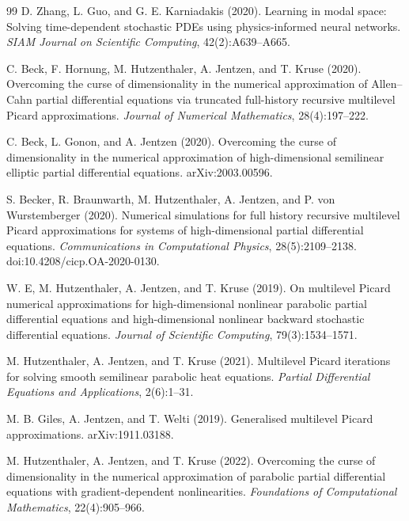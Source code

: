 \documentclass[11pt]{article}
\theoremstyle{definition}
\theoremstyle{plain}
\begin{document}
\begin{appendices}
\begin{thebibliography}{99}
 D. Zhang, L. Guo, and G. E. Karniadakis (2020). \newblock Learning in modal space: Solving time-dependent stochastic PDEs using physics-informed neural networks. \newblock \emph{SIAM Journal on Scientific Computing}, 42(2):A639--A665.

 C. Beck, F. Hornung, M. Hutzenthaler, A. Jentzen, and T. Kruse (2020). \newblock Overcoming the curse of dimensionality in the numerical approximation of Allen--Cahn partial differential equations via truncated full-history recursive multilevel Picard approximations. \newblock \emph{Journal of Numerical Mathematics}, 28(4):197--222.

 C. Beck, L. Gonon, and A. Jentzen (2020). \newblock Overcoming the curse of dimensionality in the numerical approximation of high-dimensional semilinear elliptic partial differential equations. \newblock arXiv:2003.00596.

 S. Becker, R. Braunwarth, M. Hutzenthaler, A. Jentzen, and P. von Wurstemberger (2020). \newblock Numerical simulations for full history recursive multilevel Picard approximations for systems of high-dimensional partial differential equations. \newblock \emph{Communications in Computational Physics}, 28(5):2109--2138. doi:10.4208/cicp.OA-2020-0130.

 W. E, M. Hutzenthaler, A. Jentzen, and T. Kruse (2019). \newblock On multilevel Picard numerical approximations for high-dimensional nonlinear parabolic partial differential equations and high-dimensional nonlinear backward stochastic differential equations. \newblock \emph{Journal of Scientific Computing}, 79(3):1534--1571.

 M. Hutzenthaler, A. Jentzen, and T. Kruse (2021). \newblock Multilevel Picard iterations for solving smooth semilinear parabolic heat equations. \newblock \emph{Partial Differential Equations and Applications}, 2(6):1--31.

 M. B. Giles, A. Jentzen, and T. Welti (2019). \newblock Generalised multilevel Picard approximations. \newblock arXiv:1911.03188.

 M. Hutzenthaler, A. Jentzen, and T. Kruse (2022). \newblock Overcoming the curse of dimensionality in the numerical approximation of parabolic partial differential equations with gradient-dependent nonlinearities. \newblock \emph{Foundations of Computational Mathematics}, 22(4):905--966.


\end{thebibliography}
\end{appendices}
\end{document}
